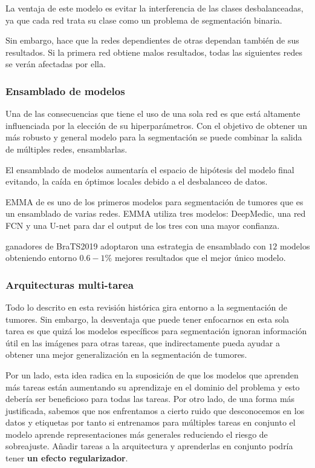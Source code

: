 			La ventaja de este modelo es evitar la interferencia de las clases desbalanceadas, ya que cada red trata su clase como un problema de segmentación binaria. 
			
			Sin embargo, hace que la redes dependientes de otras dependan también de sus resultados. Si la primera red obtiene malos resultados, todas las siguientes redes se verán afectadas por ella.
					
			\subsubsection{Ensamblado de modelos}
			
			Una de las consecuencias que tiene el uso de una sola red es que está altamente influenciada por la elección de su hiperparámetros. Con el objetivo de obtener un más robusto y general modelo para la segmentación se puede combinar la salida de múltiples redes, ensamblarlas.
			
			El ensamblado de modelos aumentaría el espacio de hipótesis del modelo final evitando, la caída en óptimos locales debido a el desbalanceo de datos.
			
			EMMA  de \cite{kamnitsas2018ensembles} es uno de los primeros modelos para segmentación de tumores que es un ensamblado de varias redes. EMMA utiliza tres modelos: DeepMedic, una red FCN y una U-net para dar el output de los tres con una mayor confianza.
			
			\cite{jiang2020two} ganadores de BraTS2019 adoptaron una estrategia de ensamblado con $12$ modelos obteniendo entorno $0.6 - 1 \%$ mejores resultados que el mejor único modelo.
			
			\subsubsection{Arquitecturas multi-tarea}
			
			Todo lo descrito en esta revisión histórica gira entorno a la segmentación de tumores. Sin embargo, la desventaja que puede tener enfocarnos en esta sola tarea es que quizá los modelos específicos para segmentación ignoran información útil en las imágenes para otras tareas, que indirectamente pueda ayudar a obtener una mejor generalización en la segmentación de tumores. 
			
			Por un lado, esta idea radica en la suposición de que los modelos que aprenden más tareas están aumentando su aprendizaje en el dominio del problema y esto debería ser beneficioso para todas las tareas. Por otro lado, de una forma más justificada, sabemos que nos enfrentamos a cierto ruido que desconocemos en los datos y etiquetas por tanto si entrenamos para múltiples tareas en conjunto el modelo aprende representaciones más generales reduciendo el riesgo de sobreajuste. Añadir tareas a la arquitectura y aprenderlas en conjunto podría tener \textbf{un efecto regularizador}.
			
